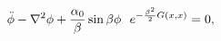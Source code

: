 \begin{equation}
\ddot{\phi} - \nabla^2 \phi + {\alpha_0 \over \beta} \sin \beta \phi
~~e^{- {\beta^2 \over 2} G(x,x)} =0 \label{eq:phi},
\end{equation}

